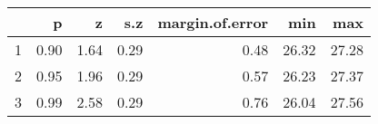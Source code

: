 \documentclass[letterpaper, landscape]{exam}
\begin{document}
\begin{description}
\begin{enumerate}[(a)]
          \begin{table}[ht]
          \centering
          \begin{tabular}{rrrrrrr}
            \toprule
              & p    & z    & s.z  & margin.of.error & min   & max \\
            \midrule
            1 & 0.90 & 1.64 & 0.29 & 0.48            & 26.32 & 27.28 \\
            2 & 0.95 & 1.96 & 0.29 & 0.57            & 26.23 & 27.37 \\
            3 & 0.99 & 2.58 & 0.29 & 0.76            & 26.04 & 27.56 \\
            \bottomrule
          \end{tabular}
          \end{table}
      \end{enumerate}

  \end{description}
\end{document}
